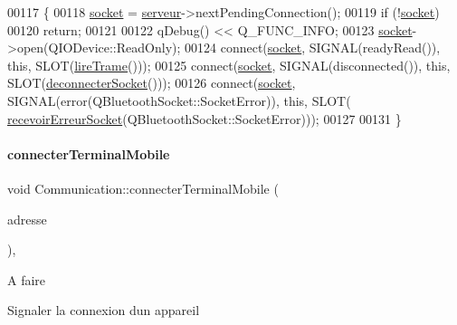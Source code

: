 \begin{DoxyCode}
00117 \{
00118     \hyperlink{class_communication_aa4ddc3151b305db0135d5826384645cc}{socket} = \hyperlink{class_communication_a6384747297d6efa9e8fd2fc79ed0c269}{serveur}->nextPendingConnection();
00119     \textcolor{keywordflow}{if} (!\hyperlink{class_communication_aa4ddc3151b305db0135d5826384645cc}{socket})
00120         \textcolor{keywordflow}{return};
00121 
00122     qDebug() << Q\_FUNC\_INFO;
00123     \hyperlink{class_communication_aa4ddc3151b305db0135d5826384645cc}{socket}->open(QIODevice::ReadOnly);
00124     connect(\hyperlink{class_communication_aa4ddc3151b305db0135d5826384645cc}{socket}, SIGNAL(readyRead()), \textcolor{keyword}{this}, SLOT(\hyperlink{class_communication_ad99afe857470e6e95432b3adcb97fea2}{lireTrame}()));
00125     connect(\hyperlink{class_communication_aa4ddc3151b305db0135d5826384645cc}{socket}, SIGNAL(disconnected()), \textcolor{keyword}{this}, SLOT(\hyperlink{class_communication_a5280c11bea5ead32e7a7101fd5b0f9b2}{deconnecterSocket}()));
00126     connect(\hyperlink{class_communication_aa4ddc3151b305db0135d5826384645cc}{socket}, SIGNAL(error(QBluetoothSocket::SocketError)), \textcolor{keyword}{this}, SLOT(
      \hyperlink{class_communication_a94a9c34e683d590fc6abbc4111a57f29}{recevoirErreurSocket}(QBluetoothSocket::SocketError)));
00127 
00131 \}
\end{DoxyCode}
\mbox{\label{class_communication_a9640339b93f4a99f80426b7345615037}} 
\paragraph{\texorpdfstring{connecter\+Terminal\+Mobile}{connecterTerminalMobile}}
{\footnotesize\ttfamily void Communication\+::connecter\+Terminal\+Mobile (\begin{DoxyParamCaption}\item[{const Q\+Bluetooth\+Address \&}]{adresse }\end{DoxyParamCaption})\hspace{0.3cm}{\ttfamily [private]}, {\ttfamily [slot]}}

\begin{DoxyRefDesc}{A faire}
\item[\hyperlink{todo__todo000002}{A faire}]Signaler la connexion d\textquotesingle{}un appareil \end{DoxyRefDesc}


